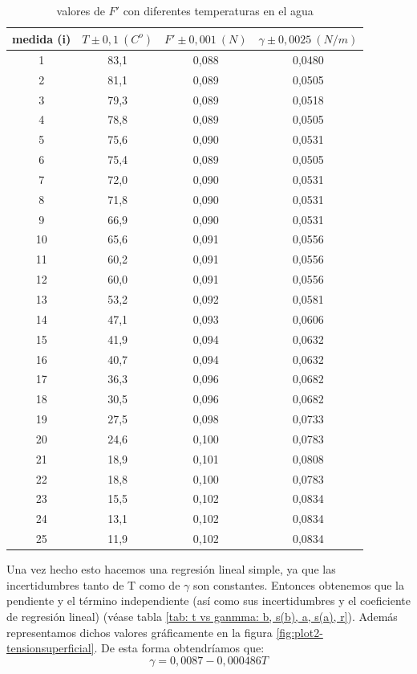 \documentclass[12pt,a4paper]{book}
\begin{document}
\begin{table}[h!] %
\begin{center}
\begin{tabular}{|c|c|c|c|}
\hline
medida (i) & 	 $T \pm 0,1  \ (C^o)$ & 	 $F' \pm 0,001 \ (N) $ & 	 $\gamma \pm 0,0025 \ (N/m) $ \\ \hline
1 & 	 83,1 & 	 0,088 & 	 0,0480 \\
2 & 	 81,1 & 	 0,089 & 	 0,0505 \\
3 & 	 79,3 & 	 0,089 & 	 0,0518 \\
4 & 	 78,8 & 	 0,089 & 	 0,0505 \\
5 & 	 75,6 & 	 0,090 & 	 0,0531 \\
6 & 	 75,4 & 	 0,089 & 	 0,0505 \\
7 & 	 72,0 & 	 0,090 & 	 0,0531 \\
8 & 	 71,8 & 	 0,090 & 	 0,0531 \\
9 & 	 66,9 & 	 0,090 & 	 0,0531 \\
10 & 	 65,6 & 	 0,091 & 	 0,0556 \\
11 & 	 60,2 & 	 0,091 & 	 0,0556 \\
12 & 	 60,0 & 	 0,091 & 	 0,0556 \\
13 & 	 53,2 & 	 0,092 & 	 0,0581 \\
14 & 	 47,1 & 	 0,093 & 	 0,0606 \\
15 & 	 41,9 & 	 0,094 & 	 0,0632 \\
16 & 	 40,7 & 	 0,094 & 	 0,0632 \\
17 & 	 36,3 & 	 0,096 & 	 0,0682 \\
18 & 	 30,5 & 	 0,096 & 	 0,0682 \\
19 & 	 27,5 & 	 0,098 & 	 0,0733 \\
20 & 	 24,6 & 	 0,100 & 	 0,0783 \\
21 & 	 18,9 & 	 0,101 & 	 0,0808 \\
22 & 	 18,8 & 	 0,100 & 	 0,0783 \\
23 & 	 15,5 & 	 0,102 & 	 0,0834 \\
24 & 	 13,1 & 	 0,102 & 	 0,0834 \\
25 & 	 11,9 & 	 0,102 & 	 0,0834 \\   \hline
\end{tabular}
\caption{valores de $F'$ con diferentes temperaturas en el agua}
\label{tab:t vs f'}
\end{center}
\end{table}

Una vez hecho esto hacemos una regresión lineal simple, ya que las incertidumbres tanto de T como de $\gamma$ son constantes. Entonces obtenemos que la pendiente y el término independiente (así como sus incertidumbres y el coeficiente de regresión lineal) (véase tabla \ref{tab: t vs ganmma: b, s(b), a, s(a), r}). Además representamos dichos valores gráficamente en la figura \ref{fig:plot2-tensionsuperficial}. De esta forma obtendríamos que:
$$ \gamma = 0,0087 - 0,000486 T$$
\end{document}
